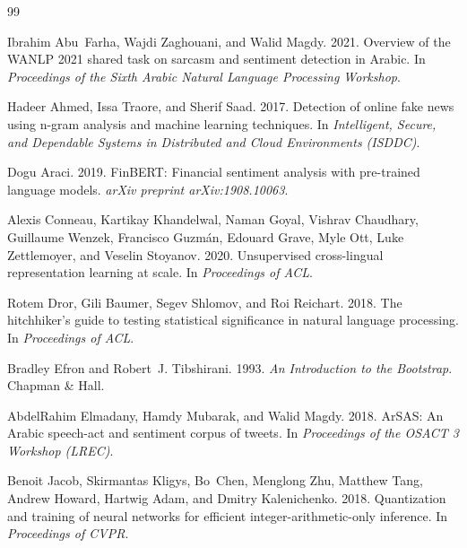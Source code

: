 \documentclass[11pt,a4paper,twocolumn]{article}
\begin{document}
\small
\begin{thebibliography}{99}

Ibrahim Abu~Farha, Wajdi Zaghouani, and Walid Magdy. 2021.
\newblock Overview of the WANLP 2021 shared task on sarcasm and sentiment detection in
  Arabic.
\newblock In \emph{Proceedings of the Sixth Arabic Natural Language Processing
  Workshop}.

Hadeer Ahmed, Issa Traore, and Sherif Saad. 2017.
\newblock Detection of online fake news using n-gram analysis and machine learning
  techniques.
\newblock In \emph{Intelligent, Secure, and Dependable Systems in Distributed and Cloud
  Environments (ISDDC)}.

Dogu Araci. 2019.
\newblock FinBERT: Financial sentiment analysis with pre-trained language models.
\newblock \emph{arXiv preprint arXiv:1908.10063}.

Alexis Conneau, Kartikay Khandelwal, Naman Goyal, Vishrav Chaudhary, Guillaume Wenzek,
  Francisco Guzm{\'a}n, Edouard Grave, Myle Ott, Luke Zettlemoyer, and Veselin Stoyanov.
  2020.
\newblock Unsupervised cross-lingual representation learning at scale.
\newblock In \emph{Proceedings of ACL}.

Rotem Dror, Gili Baumer, Segev Shlomov, and Roi Reichart. 2018.
\newblock The hitchhiker's guide to testing statistical significance in natural language
  processing.
\newblock In \emph{Proceedings of ACL}.

Bradley Efron and Robert~J. Tibshirani. 1993.
\newblock \emph{An Introduction to the Bootstrap}.
\newblock Chapman \& Hall.

AbdelRahim Elmadany, Hamdy Mubarak, and Walid Magdy. 2018.
\newblock ArSAS: An Arabic speech-act and sentiment corpus of tweets.
\newblock In \emph{Proceedings of the OSACT 3 Workshop (LREC)}.

Benoit Jacob, Skirmantas Kligys, Bo~Chen, Menglong Zhu, Matthew Tang, Andrew Howard,
  Hartwig Adam, and Dmitry Kalenichenko. 2018.
\newblock Quantization and training of neural networks for efficient
  integer-arithmetic-only inference.
\newblock In \emph{Proceedings of CVPR}.


\end{thebibliography}
\end{document}
